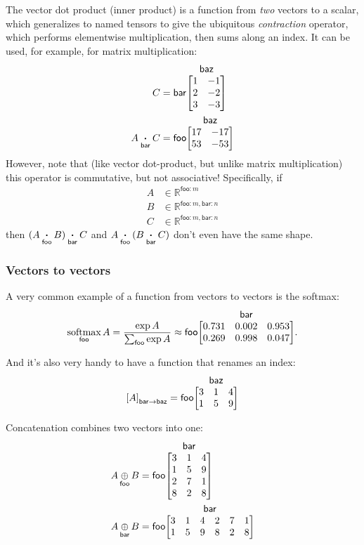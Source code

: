 \documentclass{article}
\makeatletter
\newcommand{\name}[1]{\mathsf{#1}}
\newcommand{\nset}[2]{\name{#1}:#2}
\newcommand{\ndot}[1]{\mathbin{\mathop{\thinspace\boldsymbol\cdot\thinspace}\limits_{\name{#1}}}}
\newcommand{\nsum}[1]{\mathop{\sum}_{\name{#1}}}
\newcommand{\ncat}[1]{\mathop{\oplus}_{\name{#1}}}
\newcommand{\nfun}[2]{\mathop{\text{#2}}\limits_{\name{#1}}}
\newcommand{\nmov}[3]{\left[#3\right]_{\name{#1}\rightarrow\name{#2}}}
\newcommand{\nmatrix}[3]{\name{#1}\begin{array}[b]{@{}c@{}}\name{#2}\\\begin{bmatrix}#3\end{bmatrix}\end{array}}
\makeatother
\begin{document}
The vector dot product (inner product) is a function from \emph{two} vectors to a scalar, which generalizes to named tensors to give the ubiquitous \emph{contraction} operator, which performs elementwise multiplication, then sums along an index. It can be used, for example, for matrix multiplication:
\begin{align*}
C &= \nmatrix{bar}{baz}{
  1 & -1 \\ 2 & -2 \\ 3 & -3
} \\
A \ndot{bar} C &= \nmatrix{foo}{baz}{
  17 & -17 \\
  53 & -53
}
\end{align*}
However, note that (like vector dot-product, but unlike matrix multiplication) this operator is commutative, but not associative! Specifically, if
\begin{align*}
A &\in \mathbb{R}^{\nset{foo}{m}} \\
B &\in \mathbb{R}^{\nset{foo}{m},\nset{bar}{n}} \\
C &\in \mathbb{R}^{\nset{foo}{m},\nset{bar}{n}}
\end{align*}
then $(A \ndot{foo} B) \ndot{bar} C$ and $A \ndot{foo} (B \ndot{bar} C)$ don't even have the same shape.

\subsubsection{Vectors to vectors}

A very common example of a function from vectors to vectors is the softmax:
\begin{equation*}
  \nfun{foo}{softmax} A = \frac{\exp A}{\nsum{foo} \exp A} \approx \nmatrix{foo}{bar}{
    0.731 & 0.002 & 0.953 \\
    0.269 & 0.998 & 0.047
  }.
\end{equation*}

And it's also very handy to have a function that renames an index:
\begin{equation*}
\nmov{bar}{baz}{A} = \nmatrix{foo}{baz}{
  3 & 1 & 4 \\
  1 & 5 & 9
}
\end{equation*}

Concatenation combines two vectors into one:
\begin{align*}
  A \ncat{foo} B &= \nmatrix{foo}{bar}{
    3 & 1 & 4 \\
    1 & 5 & 9 \\
    2 & 7 & 1 \\
    8 & 2 & 8
  } \\
  A \ncat{bar} B &= \nmatrix{foo}{bar}{
    3 & 1 & 4 & 2 & 7 & 1 \\
    1 & 5 & 9 & 8 & 2 & 8
  }
\end{align*}
\end{document}
